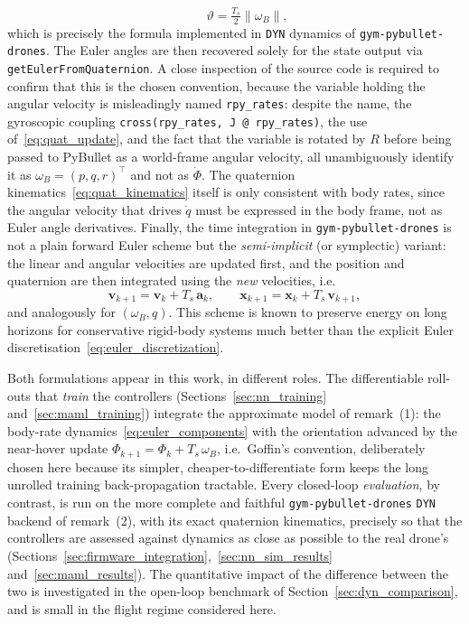 \documentclass[11pt,a4paper]{article}
\theoremstyle{remark}
\numberwithin{equation}{section}
\begin{document}
\begin{enumerate}
\begin{equation}
    \qquad \vartheta = \tfrac{T_s}{2}\|\omega_B\|,
    \label{eq:quat_update}
    \end{equation}
    which is precisely the formula implemented in \texttt{DYN} dynamics of \texttt{gym-pybullet-drones}. The Euler angles
    are then recovered solely for the state output via \texttt{getEulerFromQuaternion}.
    A close inspection of the source code is required to confirm that this is the chosen
    convention, because the variable holding the angular velocity is misleadingly named
    \texttt{rpy\_rates}: despite the name, the gyroscopic coupling
    \texttt{cross(rpy\_rates, J\,@\,rpy\_rates)}, the use
    of~\eqref{eq:quat_update}, and the fact that the variable is rotated by $R$ before
    being passed to PyBullet as a world-frame angular velocity, all unambiguously identify
    it as $\omega_B = (p, q, r)^\top$ and not as $\dot{\Phi}$. The quaternion
    kinematics~\eqref{eq:quat_kinematics} itself is only consistent with body rates,
    since the angular velocity that drives $\dot q$ must be expressed in the body frame,
    not as Euler angle derivatives. Finally, the time integration in
    \texttt{gym-pybullet-drones} is not a plain forward Euler scheme but the
    \emph{semi-implicit} (or symplectic) variant: the linear and angular velocities are
    updated first, and the position and quaternion are then integrated using the
    \emph{new} velocities, i.e.\
    \begin{equation*}
    \mathbf{v}_{k+1} = \mathbf{v}_k + T_s\, \mathbf{a}_k, \qquad
    \mathbf{x}_{k+1} = \mathbf{x}_k + T_s\, \mathbf{v}_{k+1},
    \end{equation*}
    and analogously for $(\omega_B, q)$. This scheme is known to preserve energy on long
    horizons for conservative rigid-body systems much better than the explicit Euler
    discretisation~\eqref{eq:euler_discretization}.
\end{enumerate}
Both formulations appear in this work, in different roles. The differentiable roll-outs
that \emph{train} the controllers (Sections~\ref{sec:nn_training}
and~\ref{sec:maml_training}) integrate the approximate model of remark~(1): the body-rate
dynamics~\eqref{eq:euler_components} with the orientation advanced by the near-hover update
$\Phi_{k+1} = \Phi_k + T_s\,\omega_B$, i.e.\ Goffin's convention, deliberately chosen here
because its simpler, cheaper-to-differentiate form keeps the long unrolled training
back-propagation tractable. Every closed-loop \emph{evaluation}, by contrast, is run on the
more complete and faithful \texttt{gym-pybullet-drones} \texttt{DYN} backend of remark~(2),
with its exact quaternion kinematics, precisely so that the controllers are assessed against
dynamics as close as possible to the real drone's
(Sections~\ref{sec:firmware_integration},~\ref{sec:nn_sim_results}
and~\ref{sec:maml_results}). The quantitative impact of the difference between the two is
investigated in the open-loop benchmark of Section~\ref{sec:dyn_comparison}, and is small
in the flight regime considered here.
\end{document}

